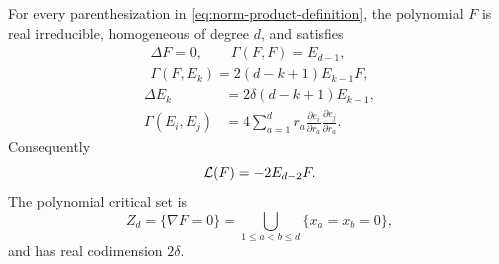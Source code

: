 \begin{proposition}
\label{prop:norm-product-closure}
For every parenthesization in \eqref{eq:norm-product-definition},
the polynomial \(F\) is real irreducible, homogeneous of degree \(d\), and
satisfies
\begin{equation}\label{eq:norm-product-F-closure}
\begin{gathered}
 \Delta F=0,\qquad \Gamma(F,F)=E_{d-1},\\
 \Gamma(F,E_k)=2(d-k+1)E_{k-1}F,
\end{gathered}
\end{equation}
\begin{equation}\label{eq:norm-product-E-closure}
\begin{aligned}
 \Delta E_k&=2\delta(d-k+1)E_{k-1},\\
 \Gamma(E_i,E_j)&=4\sum_{a=1}^d r_a
       \frac{\partial e_i}{\partial r_a}
       \frac{\partial e_j}{\partial r_a}.
\end{aligned}
\end{equation}
Consequently
\begin{equation}\label{eq:norm-product-minimality}
 \mathcal L(F)=-2E_{d-2}F.
\end{equation}
The polynomial critical set is
\begin{equation}\label{eq:norm-product-critical-set}
 Z_d=\{\nabla F=0\}
 =\bigcup_{1\le a<b\le d}\{x_a=x_b=0\},
\end{equation}
and has real codimension \(2\delta\).
\end{proposition}

